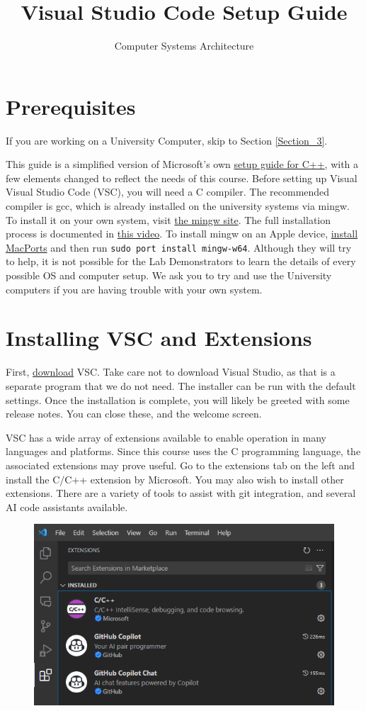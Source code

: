 \documentclass{article}
\title{Visual Studio Code Setup Guide}
\author{Computer Systems Architecture}
\begin{document}
\maketitle

\section{Prerequisites}

If you are working on a University Computer, skip to Section \ref{Section_3}.


This guide is a simplified version of Microsoft's own \href{https://code.visualstudio.com/docs/cpp/config-mingw}{setup guide for C++}, with a few elements changed to reflect the needs of this course. 
Before setting up Visual Visual Studio Code (VSC), you will need a C compiler. The recommended compiler is gcc, which is already installed on the university systems via mingw. To install it on your own system, visit \href{https://www.mingw-w64.org/}{the mingw site}. The full installation process is documented in \href{https://www.youtube.com/watch?v=oC69vlWofJQ}{this video}. To install mingw on an Apple device, \href{https://www.macports.org/install.php}{install MacPorts} and then run \verb|sudo port install mingw-w64|. Although they will try to help, it is not possible for the Lab Demonstrators to learn the details of every possible OS and computer setup. We ask you to try and use the University computers if you are having trouble with your own system. 

\section{Installing VSC and Extensions}
First, \href{https://code.visualstudio.com/download}{download} VSC. Take care not to download Visual Studio, as that is a separate program that we do not need. The installer can be run with the default settings. Once the installation is complete, you will likely be greeted with some release notes. You can close these, and the welcome screen. 

VSC has a wide array of extensions available to enable operation in many languages and platforms. Since this course uses the C programming language, the associated extensions may prove useful. 
Go to the extensions tab on the left and install the C/C++ extension by Microsoft. You may also wish to install other extensions. There are a variety of tools to assist with git integration, and several AI code assistants available.
\begin{figure}[h]
    \centering
    \includegraphics[width=0.5\linewidth]{extensions.png}
    \label{fig:enter-label}
\end{figure}
\end{document}
